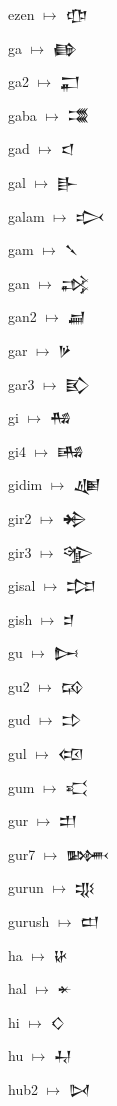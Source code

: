 {\noindent ezen $\mapsto$ {\cufont 𒂡}\par
\noindent ga $\mapsto$ {\cufont 𒂵}\par
\noindent ga2 $\mapsto$ {\cufont 𒂷}\par
\noindent gaba $\mapsto$ {\cufont 𒃮}\par
\noindent gad $\mapsto$ {\cufont 𒃰}\par
\noindent gal $\mapsto$ {\cufont 𒃲}\par
\noindent galam $\mapsto$ {\cufont 𒃴}\par
\noindent gam $\mapsto$ {\cufont 𒃵}\par
\noindent gan $\mapsto$ {\cufont 𒃶}\par
\noindent gan2 $\mapsto$ {\cufont 𒃷}\par
\noindent gar $\mapsto$ {\cufont 𒃻}\par
\noindent gar3 $\mapsto$ {\cufont 𒃼}\par
\noindent gi $\mapsto$ {\cufont 𒄀}\par
\noindent gi4 $\mapsto$ {\cufont 𒄄}\par
\noindent gidim $\mapsto$ {\cufont 𒄇}\par
\noindent gir2 $\mapsto$ {\cufont 𒄈}\par
\noindent gir3 $\mapsto$ {\cufont 𒄊}\par
\noindent gisal $\mapsto$ {\cufont 𒄐}\par
\noindent gish $\mapsto$ {\cufont 𒄑}\par
\noindent gu $\mapsto$ {\cufont 𒄖}\par
\noindent gu2 $\mapsto$ {\cufont 𒄘}\par
\noindent gud $\mapsto$ {\cufont 𒄞}\par
\noindent gul $\mapsto$ {\cufont 𒄢}\par
\noindent gum $\mapsto$ {\cufont 𒄣}\par
\noindent gur $\mapsto$ {\cufont 𒄥}\par
\noindent gur7 $\mapsto$ {\cufont 𒄦}\par
\noindent gurun $\mapsto$ {\cufont 𒄧}\par
\noindent gurush $\mapsto$ {\cufont 𒄨}\par
\noindent ha $\mapsto$ {\cufont 𒄩}\par
\noindent hal $\mapsto$ {\cufont 𒄬}\par
\noindent hi $\mapsto$ {\cufont 𒄭}\par
\noindent hu $\mapsto$ {\cufont 𒄷}\par
\noindent hub2 $\mapsto$ {\cufont 𒄸}\par
}
